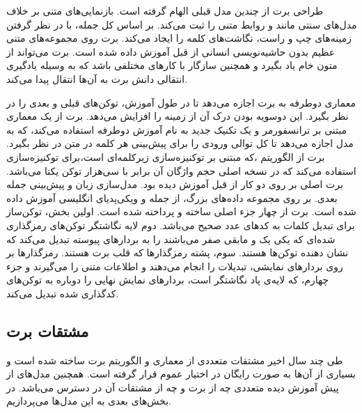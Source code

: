 طراحی برت از چندین مدل قبلی الهام گرفته است. بازنمایی‌های متنی  بر خلاف مدل‌های سنتی مانند  \cite{mikolov2013efficient} و \cite{pennington2014glove}  روابط متنی  را ثبت می‌کند. بر اساس کل جمله،  با در نظر گرفتن زمینه‌های چپ و راست، نگاشت‌های کلمه را  ایجاد می‌کند.
برت روی مجموعه‌های متنی عظیم بدون حاشیه‌نویسی انسانی  از قبل آموزش داده‌ شده  است. برت می‌تواند از متون خام یاد بگیرد و همچنین سازگار با کارهای مختلفی باشد که به وسیله یادگیری انتقالی دانش برت به آن‌ها انتقال پیدا می‌کند.

 معماری دوطرفه به برت اجازه می‌دهد تا در طول آموزش، توکن‌های قبلی و بعدی را در نظر بگیرد. این دوسویه بودن درک آن از زمینه را افزایش‌ می‌دهد. برت از یک معماری مبتنی بر ترانسفورمر و یک تکنیک جدید به نام آموزش دوطرفه استفاده می‌کند، که به مدل اجازه می‌دهد تا کل توالی ورودی را برای پیش‌بینی هر کلمه در متن در نظر بگیرد. برت از الگوریتم \cite{wu2016google} ،که مبتنی بر توکنیزه‌سازی زیرکلمه‌ای است،برای توکنیزه‌سازی استفاده می‌کند که در نسخه اصلی حجم واژگان آن برابر با سی‌هزار توکن یکتا می‌باشد.
برت اصلی بر روی دو کار از قبل آموزش دیده بود. مدل‌سازی زبان و پیش‌بینی جمله بعدی. بر روی مجموعه داده‌های بزرگ، از جمله  و ویکی‌پدیای انگلیسی  آموزش داده شده است.
برت از چهار جز‌‌ء اصلی ساخته و پرداخته شده است. اولین بخش، توکن‌ساز  برای تبدیل کلمات به کدهای عدد صحیح می‌باشد. دوم لایه نگاشتگر   توکن‌های رمزگذاری شده‌‌ای که یکی یک و مابقی صفر می‌باشند را به بردارهای پیوسته تبدیل می‌کند که نشان دهنده توکن‌ها هستند. سوم، پشته رمزگذارها که قلب برت هستند. رمزگذارها بر روی بردارهای نمایشی، تبدیلات را انجام می‌دهند و اطلاعات متنی را می‌گیرند و جزء چهارم، که لایه‌ی پاد نگاشتگر است، بردارهای نمایش نهایی را دوباره به توکن‌های کدگذاری شده  تبدیل می‌کند.

\subsection{مشتقات برت}
\hspace{30pt}
طی چند سال اخیر مشتقات متعددی از معماری و الگوریتم برت ساخته شده است و بسیاری از آن‌ها به صورت رایگان در اختیار عموم قرار گرفته است. همچنین مدل‌های از پیش آموزش دیده متعددی چه از برت و چه از مشتقات آن در دسترس می‌باشد. در بخش‌های بعدی به این مدل‌ها می‌پردازیم.

